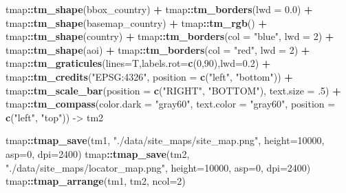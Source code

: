 \documentclass[
]{article}
\newenvironment{Shaded}{\begin{snugshade}}{\end{snugshade}}
\newcommand{\AttributeTok}[1]{\textcolor[rgb]{0.13,0.29,0.53}{#1}}
\newcommand{\DecValTok}[1]{\textcolor[rgb]{0.00,0.00,0.81}{#1}}
\newcommand{\FloatTok}[1]{\textcolor[rgb]{0.00,0.00,0.81}{#1}}
\newcommand{\FunctionTok}[1]{\textcolor[rgb]{0.13,0.29,0.53}{\textbf{#1}}}
\newcommand{\NormalTok}[1]{#1}
\newcommand{\OtherTok}[1]{\textcolor[rgb]{0.56,0.35,0.01}{#1}}
\newcommand{\SpecialCharTok}[1]{\textcolor[rgb]{0.81,0.36,0.00}{\textbf{#1}}}
\newcommand{\StringTok}[1]{\textcolor[rgb]{0.31,0.60,0.02}{#1}}
\begin{document}
\begin{Shaded}
\begin{Highlighting}[]
\NormalTok{tmap}\SpecialCharTok{::}\FunctionTok{tm\_shape}\NormalTok{(bbox\_country) }\SpecialCharTok{+}\NormalTok{ tmap}\SpecialCharTok{::}\FunctionTok{tm\_borders}\NormalTok{(}\AttributeTok{lwd =} \FloatTok{0.0}\NormalTok{) }\SpecialCharTok{+}
\NormalTok{  tmap}\SpecialCharTok{::}\FunctionTok{tm\_shape}\NormalTok{(basemap\_country) }\SpecialCharTok{+}\NormalTok{ tmap}\SpecialCharTok{::}\FunctionTok{tm\_rgb}\NormalTok{() }\SpecialCharTok{+} 
\NormalTok{  tmap}\SpecialCharTok{::}\FunctionTok{tm\_shape}\NormalTok{(country) }\SpecialCharTok{+}\NormalTok{ tmap}\SpecialCharTok{::}\FunctionTok{tm\_borders}\NormalTok{(}\AttributeTok{col =} \StringTok{"blue"}\NormalTok{, }\AttributeTok{lwd =} \DecValTok{2}\NormalTok{) }\SpecialCharTok{+}
\NormalTok{  tmap}\SpecialCharTok{::}\FunctionTok{tm\_shape}\NormalTok{(aoi) }\SpecialCharTok{+}\NormalTok{ tmap}\SpecialCharTok{::}\FunctionTok{tm\_borders}\NormalTok{(}\AttributeTok{col =} \StringTok{"red"}\NormalTok{, }\AttributeTok{lwd =} \DecValTok{2}\NormalTok{) }\SpecialCharTok{+}
\NormalTok{  tmap}\SpecialCharTok{::}\FunctionTok{tm\_graticules}\NormalTok{(}\AttributeTok{lines=}\NormalTok{T,}\AttributeTok{labels.rot=}\FunctionTok{c}\NormalTok{(}\DecValTok{0}\NormalTok{,}\DecValTok{90}\NormalTok{),}\AttributeTok{lwd=}\FloatTok{0.2}\NormalTok{) }\SpecialCharTok{+}
\NormalTok{  tmap}\SpecialCharTok{::}\FunctionTok{tm\_credits}\NormalTok{(}\StringTok{"EPSG:4326"}\NormalTok{, }\AttributeTok{position =} \FunctionTok{c}\NormalTok{(}\StringTok{"left"}\NormalTok{, }\StringTok{"bottom"}\NormalTok{)) }\SpecialCharTok{+}
\NormalTok{  tmap}\SpecialCharTok{::}\FunctionTok{tm\_scale\_bar}\NormalTok{(}\AttributeTok{position =} \FunctionTok{c}\NormalTok{(}\StringTok{"RIGHT"}\NormalTok{, }\StringTok{"BOTTOM"}\NormalTok{), }\AttributeTok{text.size =}\NormalTok{ .}\DecValTok{5}\NormalTok{) }\SpecialCharTok{+} 
\NormalTok{  tmap}\SpecialCharTok{::}\FunctionTok{tm\_compass}\NormalTok{(}\AttributeTok{color.dark =} \StringTok{"gray60"}\NormalTok{, }\AttributeTok{text.color =} \StringTok{"gray60"}\NormalTok{, }\AttributeTok{position =} \FunctionTok{c}\NormalTok{(}\StringTok{"left"}\NormalTok{, }\StringTok{"top"}\NormalTok{)) }\OtherTok{{-}\textgreater{}}\NormalTok{ tm2}
                   
\NormalTok{tmap}\SpecialCharTok{::}\FunctionTok{tmap\_save}\NormalTok{(tm1, }\StringTok{"./data/site\_maps/site\_map.png"}\NormalTok{, }\AttributeTok{height=}\DecValTok{10000}\NormalTok{, }\AttributeTok{asp=}\DecValTok{0}\NormalTok{, }\AttributeTok{dpi=}\DecValTok{2400}\NormalTok{)}
\NormalTok{tmap}\SpecialCharTok{::}\FunctionTok{tmap\_save}\NormalTok{(tm2, }\StringTok{"./data/site\_maps/locator\_map.png"}\NormalTok{, }\AttributeTok{height=}\DecValTok{10000}\NormalTok{, }\AttributeTok{asp=}\DecValTok{0}\NormalTok{, }\AttributeTok{dpi=}\DecValTok{2400}\NormalTok{)}
\NormalTok{tmap}\SpecialCharTok{::}\FunctionTok{tmap\_arrange}\NormalTok{(tm1, tm2, }\AttributeTok{ncol=}\DecValTok{2}\NormalTok{)}
\end{Highlighting}
\end{Shaded}
\end{document}
